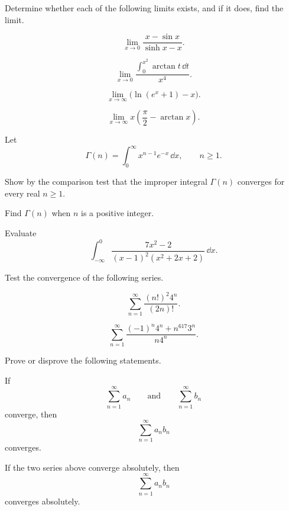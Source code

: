\begin{problem}
Determine whether each of the following limits exists, and if it does, find the limit.
\begin{problemsubparts}
\item
\[
\lim_{x\to0}\frac{x-\sin x}{\sinh x-x}.
\]
\item
\[
\lim_{x\to0}
\frac{\displaystyle\int_0^{x^2}\arctan t\,\dd t}{x^4}.
\]
\item
\[
\lim_{x\to\infty}\bigl(\ln(e^x+1)-x\bigr).
\]
\item
\[
\lim_{x\to\infty}x\left(\frac\pi2-\arctan x\right).
\]
\end{problemsubparts}
\end{problem}

\begin{problem}
Let
\[
\Gamma(n)=\int_0^\infty x^{n-1}e^{-x}\,\dd x,
\qquad n\ge1.
\]
\begin{problemsubparts}
\item Show by the comparison test that the improper integral $\Gamma(n)$ converges for every real $n\ge1$.
\item Find $\Gamma(n)$ when $n$ is a positive integer.
\end{problemsubparts}
\end{problem}

\begin{problem}
Evaluate
\[
\int_{-\infty}^{0}
\frac{7x^2-2}{(x-1)^2(x^2+2x+2)}\,\dd x.
\]
\end{problem}

\begin{problem}
Test the convergence of the following series.
\begin{problemsubparts}
\item
\[
\sum_{n=1}^{\infty}\frac{(n!)^2 4^n}{(2n)!}.
\]
\item
\[
\sum_{n=1}^{\infty}
\frac{(-1)^n4^n+n^{617}3^n}{n4^n}.
\]
\end{problemsubparts}
\end{problem}

\begin{problem}
Prove or disprove the following statements.
\begin{problemsubparts}
\item If
\[
\sum_{n=1}^{\infty}a_n
\qquad\text{and}\qquad
\sum_{n=1}^{\infty}b_n
\]
converge, then
\[
\sum_{n=1}^{\infty}a_nb_n
\]
converges.
\item If the two series above converge absolutely, then
\[
\sum_{n=1}^{\infty}a_nb_n
\]
converges absolutely.
\end{problemsubparts}
\end{problem}

